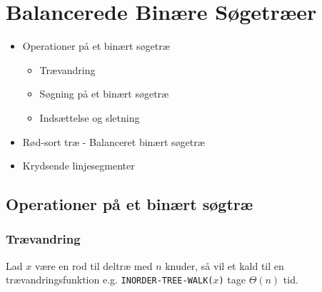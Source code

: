 \section{Balancerede Binære Søgetræer}
\hrulefill

\begin{itemize}
\item Operationer på et binært søgetræ
  \begin{itemize}
  \item Trævandring
  \item Søgning på et binært søgetræ
  \item Indsættelse og sletning
  \end{itemize}
\item Rød-sort træ - Balanceret binært søgetræ
\item Krydsende linjesegmenter
\end{itemize}

\newpage
\subsection{Operationer på et binært søgtræ}

\subsubsection{Trævandring}

\begin{theorem}
  Lad $x$ være en rod til deltræ med $n$ knuder, så vil et kald til en trævandringsfunktion e.g. \texttt{INORDER-TREE-WALK($x$)} tage $\Theta(n)$ tid.
\end{theorem}


